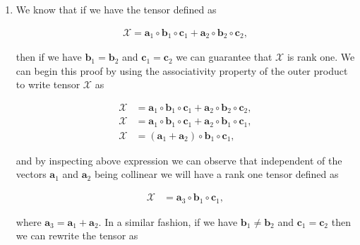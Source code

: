 \documentclass[a4paper,10pt]{article}
\begin{document}

\thispagestyle{empty}

\newpage

\thispagestyle{empty}

\begin{enumerate}
\renewcommand{\labelenumi}{{\Large\bfseries\arabic{enumi}.}}
   
    \item We know that if we have the tensor defined as
    
        \begin{align}
            \mathcal{X} = \boldsymbol{a}_{1} \circ \boldsymbol{b}_{1} \circ \boldsymbol{c}_{1} + \boldsymbol{a}_{2} \circ \boldsymbol{b}_{2} \circ \boldsymbol{c}_{2},
        \end{align}

        then if we have $\boldsymbol{b}_{1} = \boldsymbol{b}_{2}$ and $\boldsymbol{c}_{1} = \boldsymbol{c}_{2}$ we can guarantee that $\mathcal{X}$ is rank one. We can begin this proof by using the associativity property of the outer product to write tensor $\mathcal{X}$ as

        \begin{align}
            \mathcal{X} &= \boldsymbol{a}_{1} \circ \boldsymbol{b}_{1} \circ \boldsymbol{c}_{1} + \boldsymbol{a}_{2} \circ \boldsymbol{b}_{2} \circ \boldsymbol{c}_{2}, \\
            \mathcal{X} &= \boldsymbol{a}_{1} \circ \boldsymbol{b}_{1} \circ \boldsymbol{c}_{1} + \boldsymbol{a}_{2} \circ \boldsymbol{b}_{1} \circ \boldsymbol{c}_{1}, \\
            \mathcal{X} &= (\boldsymbol{a}_{1} + \boldsymbol{a}_{2}) \circ \boldsymbol{b}_{1} \circ \boldsymbol{c}_{1},
        \end{align}
        
        and by inspecting above expression we can observe that independent of the vectors $\boldsymbol{a}_{1}$ and $\boldsymbol{a}_{2}$ being collinear we will have a rank one tensor defined as
        
        \begin{align}
            \mathcal{X} &= \boldsymbol{a}_{3} \circ \boldsymbol{b}_{1} \circ \boldsymbol{c}_{1},
        \end{align}
        
        where $\boldsymbol{a}_{3} = \boldsymbol{a}_{1} + \boldsymbol{a}_{2}$. In a similar fashion, if we have $\boldsymbol{b}_{1} \neq \boldsymbol{b}_{2}$ and $\boldsymbol{c}_{1} = \boldsymbol{c}_{2}$ then we can rewrite the tensor as


\end{enumerate}
\end{document}
